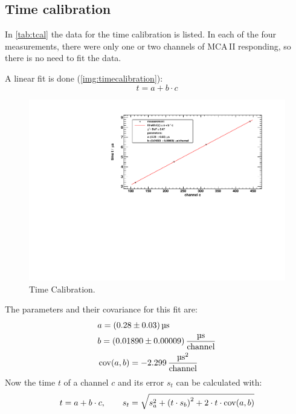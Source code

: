\subsection{Time calibration}
In \autoref{tab:tcal} the data for the time calibration is listed.
In each of the four measurements, there were only one or two channels of MCA\,II responding,
so there is no need to fit the data.

A linear fit is done (\autoref{img:timecalibration}):
\begin{equation}
    t = a + b \cdot c
\end{equation}
\begin{figure}[H]
\begin{center}
  \includegraphics[width=\textwidth]{../img/timeCalibration.pdf}
  \caption{Time Calibration.}
  \label{img:timecalibration}
\end{center}
\end{figure}
The parameters and their covariance for this fit are:
\begin{equation}
    \begin{split}
        & a = (0.28 \pm 0.03) \, \text{\textmu s} \\
        & b = (0.01890 \pm 0.00009) \, \frac{\text{\textmu s}}{\text{channel}} \\
        & \cov(a, b) = -2.299 \, \frac{\text{\textmu s}^2}{\text{channel}} 
    \end{split}
\end{equation}
Now the time $t$ of a channel $c$ and its error $s_t$ can be calculated with:
\begin{equation}
\label{eq:tcalibration}
    t = a + b \cdot c, \qquad s_t = \sqrt{s_a^2 + \left(t \cdot s_b \right)^2 + 2 \cdot t \cdot \operatorname{cov}(a,b)}
\end{equation}

